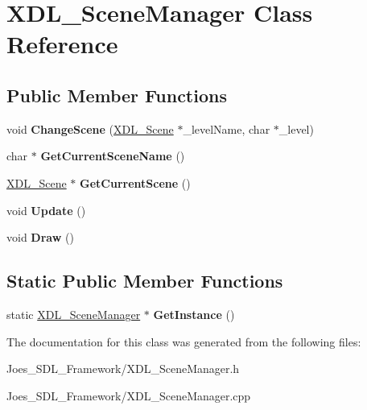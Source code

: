 \hypertarget{class_x_d_l___scene_manager}{\section{X\-D\-L\-\_\-\-Scene\-Manager Class Reference}
\label{class_x_d_l___scene_manager}
}
\subsection*{Public Member Functions}
\begin{DoxyCompactItemize}
\item 
\hypertarget{class_x_d_l___scene_manager_af5f8eae12e4346273fb9a2435cfe655b}{void {\bfseries Change\-Scene} (\hyperlink{class_x_d_l___scene}{X\-D\-L\-\_\-\-Scene} $\ast$\-\_\-level\-Name, char $\ast$\-\_\-level)}\label{class_x_d_l___scene_manager_af5f8eae12e4346273fb9a2435cfe655b}

\item 
\hypertarget{class_x_d_l___scene_manager_ad3c4876932e507a849c54a66b88264de}{char $\ast$ {\bfseries Get\-Current\-Scene\-Name} ()}\label{class_x_d_l___scene_manager_ad3c4876932e507a849c54a66b88264de}

\item 
\hypertarget{class_x_d_l___scene_manager_a8adee7ad0ab4cacc98a926848a88c955}{\hyperlink{class_x_d_l___scene}{X\-D\-L\-\_\-\-Scene} $\ast$ {\bfseries Get\-Current\-Scene} ()}\label{class_x_d_l___scene_manager_a8adee7ad0ab4cacc98a926848a88c955}

\item 
\hypertarget{class_x_d_l___scene_manager_a0c7a0611cf19993ce57d71d1f8becc64}{void {\bfseries Update} ()}\label{class_x_d_l___scene_manager_a0c7a0611cf19993ce57d71d1f8becc64}

\item 
\hypertarget{class_x_d_l___scene_manager_a8ec68a45cc1dd459f7154120dfea5b59}{void {\bfseries Draw} ()}\label{class_x_d_l___scene_manager_a8ec68a45cc1dd459f7154120dfea5b59}

\end{DoxyCompactItemize}
\subsection*{Static Public Member Functions}
\begin{DoxyCompactItemize}
\item 
\hypertarget{class_x_d_l___scene_manager_aee31018d3348547c1c331d05bbb0b039}{static \hyperlink{class_x_d_l___scene_manager}{X\-D\-L\-\_\-\-Scene\-Manager} $\ast$ {\bfseries Get\-Instance} ()}\label{class_x_d_l___scene_manager_aee31018d3348547c1c331d05bbb0b039}

\end{DoxyCompactItemize}


The documentation for this class was generated from the following files\-:\begin{DoxyCompactItemize}
\item 
Joes\-\_\-\-S\-D\-L\-\_\-\-Framework/X\-D\-L\-\_\-\-Scene\-Manager.\-h\item 
Joes\-\_\-\-S\-D\-L\-\_\-\-Framework/X\-D\-L\-\_\-\-Scene\-Manager.\-cpp\end{DoxyCompactItemize}
